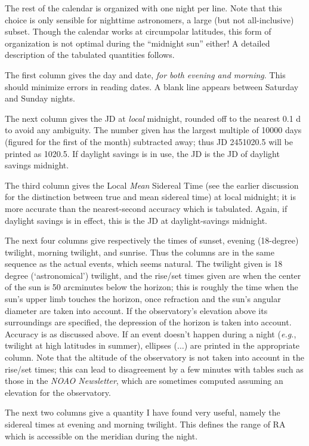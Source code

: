 The rest of the calendar is organized with one night per line.
Note that this choice is only sensible for nighttime astronomers,
a large (but not all-inclusive) subset.  Though the calendar works
at circumpolar latitudes, this form of organization is not optimal
during the ``midnight sun'' either!  A detailed description of the
tabulated quantities follows.

The first column gives the day and date, {\it for both evening and morning}.
This should minimize errors in reading dates.  A blank line 
appears between Saturday and Sunday nights.

The next column gives the JD at {\it local} midnight, rounded off to
the nearest 0.1 d to avoid any ambiguity.  The number given has
the largest multiple of 10000 days (figured for the first of the
month) subtracted away; thus JD 2451020.5 will be printed as 1020.5.
If daylight savings 
is in use, the JD is the JD of daylight savings midnight.

The third column gives the Local {\it Mean} Sidereal Time (see
the earlier discussion for the distinction between true and
mean sidereal time) at local
midnight; it is more accurate
than the nearest-second accuracy which is tabulated.  Again, 
if daylight savings is in effect, this is the JD at daylight-savings
midnight.

The next four columns give respectively the times of sunset,
evening (18-degree) twilight, morning twilight, and sunrise.  Thus the columns 
are in the same sequence as the actual events, which seems
natural.
The twilight given is 18 degree (`astronomical') twilight, 
and the rise/set times given are when the center of the sun 
is 50 arcminutes below the horizon; this is roughly the time 
when the sun's upper limb touches the horizon, once refraction
and the sun's angular diameter are taken into account.  If the
observatory's elevation above its surroundings are specified, 
the depression of the horizon is taken into account.  Accuracy
is as discussed above.  If an event doesn't happen during a night
({\it e.g.}, twilight at high latitudes in summer), ellipses ($\ldots$)
are printed in the appropriate column.  Note that the altitude of the
observatory is not taken into account in the rise/set times; this can
lead to disagreement by a few minutes with tables such as those
in the {\it NOAO Newsletter}, which are sometimes computed assuming
an elevation for the observatory.

The next two columns give a quantity I have found very useful, namely
the sidereal times at evening and morning twilight.  This defines
the range of RA which is accessible on the meridian during the night.

